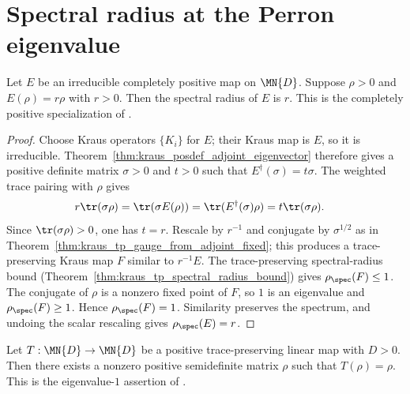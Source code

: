 \section{Spectral radius at the Perron eigenvalue}

\begin{theorem}
    \label{thm:spectral_radius_pf_irred}
    \leanok
    Let $E$ be an irreducible completely positive map on $\MN{D}$.
    Suppose $\rho > 0$ and $E(\rho) = r\rho$ with $r > 0$.
    Then the spectral radius of $E$ is $r$.
    This is the completely positive specialization of
    \cite[Theorem~6.3(4)]{Wolf2012Quantum}.
\end{theorem}

\begin{proof}
    \leanok
    Choose Kraus operators $\{K_i\}$ for $E$; their Kraus map is $E$, so it
    is irreducible.
    Theorem~\ref{thm:kraus_posdef_adjoint_eigenvector}
    therefore gives a positive definite matrix $\sigma>0$ and $t>0$ such that
    $E^\dagger(\sigma)=t\sigma$. The weighted trace pairing with $\rho$ gives
    \begin{align}
        r\tr(\sigma\rho)
         & =\tr(\sigma E(\rho))
        =\tr(E^\dagger(\sigma)\rho)
        =t\tr(\sigma\rho).
        \notag
    \end{align}
    Since $\tr(\sigma\rho)>0$, one has $t=r$. Rescale by $r^{-1}$ and
    conjugate by $\sigma^{1/2}$ as in
    Theorem~\ref{thm:kraus_tp_gauge_from_adjoint_fixed}; this produces a
    trace-preserving Kraus map $F$ similar to $r^{-1}E$.
    The trace-preserving spectral-radius bound
    (Theorem~\ref{thm:kraus_tp_spectral_radius_bound}) gives
    $\rho_{\spec}(F)\leq1$.
    The conjugate of $\rho$ is a nonzero fixed point of $F$, so $1$ is an
    eigenvalue and $\rho_{\spec}(F)\geq1$. Hence
    $\rho_{\spec}(F)=1$. Similarity preserves the spectrum, and undoing the
    scalar rescaling gives $\rho_{\spec}(E)=r$.
\end{proof}

\begin{theorem}
    \label{thm:eigenvalue_one_tp}
    \leanok
    Let $T:\MN{D}\to\MN{D}$ be a positive trace-preserving linear map
    with $D>0$.  Then there exists a nonzero positive semidefinite matrix
    $\rho$ such that $T(\rho)=\rho$.
    This is the eigenvalue-$1$ assertion of \cite[Proposition~6.1]{Wolf2012Quantum}.
\end{theorem}

